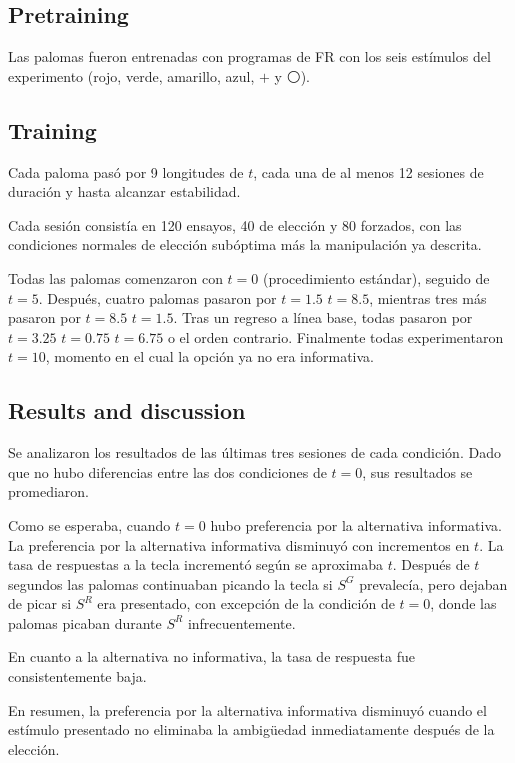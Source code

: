 \documentclass[a4paper,12pt]{article}
\begin{document}
\subsection{Pretraining}

Las palomas fueron entrenadas con programas de FR con los seis estímulos del experimento (rojo, verde, amarillo, azul, $+$ y $\medcirc$).

\subsection{Training}

Cada paloma pasó por 9 longitudes de $t$, cada una de al menos 12 sesiones de duración y hasta alcanzar estabilidad.

Cada sesión consistía en 120 ensayos, 40 de elección y 80 forzados, con las condiciones normales de elección subóptima más la manipulación ya descrita.

Todas las palomas comenzaron con $t = 0$ (procedimiento estándar), seguido de $t = 5$.
Después, cuatro palomas pasaron por $t = 1.5$ \textrightarrow $t = 8.5$, mientras tres más pasaron por $t = 8.5$ \textrightarrow $t = 1.5$.
Tras un regreso a línea base, todas pasaron por	$t = 3.25$ \textrightarrow $t = 0.75$ \textrightarrow $t = 6.75$ o el orden contrario.
Finalmente todas experimentaron $t = 10$, momento en el cual la opción ya no era informativa.

\subsection{Results and discussion}

Se analizaron los resultados de las últimas tres sesiones de cada condición.
Dado que no hubo diferencias entre las dos condiciones de $t = 0$, sus resultados se promediaron.

Como se esperaba, cuando $t = 0$ hubo preferencia por la alternativa informativa.
La preferencia por la alternativa informativa disminuyó con incrementos en $t$.
La tasa de respuestas a la tecla incrementó según se aproximaba $t$.
Después de $t$ segundos las palomas continuaban picando la tecla si $S^{G}$ prevalecía, pero dejaban de picar si $S^{R}$ era presentado, con excepción de la condición de $t = 0$, donde las palomas picaban durante $S^{R}$ infrecuentemente.

En cuanto a la alternativa no informativa, la tasa de respuesta fue consistentemente baja.

En resumen, la preferencia por la alternativa informativa disminuyó cuando el estímulo presentado no eliminaba la ambigüedad inmediatamente después de la elección.
\end{document}
